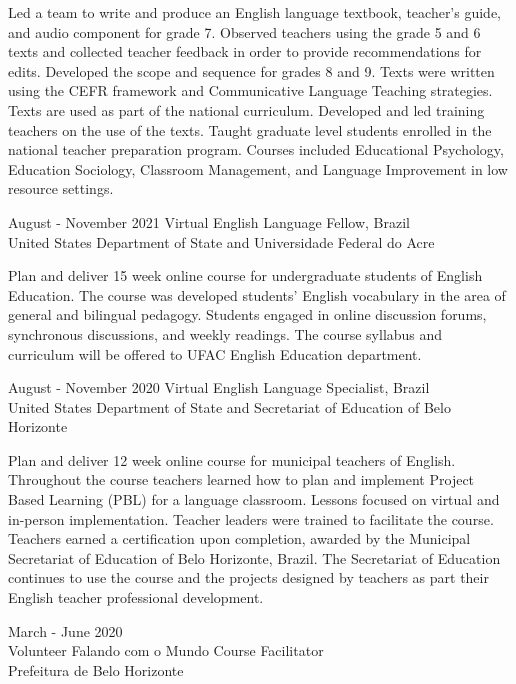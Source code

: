 \documentclass[]{scrartcl}
\begin{document}
\begin{cleanCV}
\JobDesc{}
{Led a team to write and produce an English language textbook, teacher's guide, and audio component for grade 7. Observed teachers using the grade 5 and 6 texts and collected teacher feedback in order to provide recommendations for edits. Developed the scope and sequence for grades 8 and 9. Texts were written using the CEFR framework and Communicative Language Teaching strategies. Texts are used as part of the national curriculum. Developed and led training teachers on the use of the texts. Taught graduate level students enrolled in the national teacher preparation program. Courses included Educational Psychology, Education Sociology, Classroom Management, and Language Improvement in low resource settings.}

\pagebreak    
  
\WorkExperience
{August - November 2021}
{Virtual English Language Fellow, Brazil\\}
{United States Department of State and Universidade Federal do Acre}

\JobDesc{}
{Plan and deliver 15 week online course for undergraduate students of English Education. The course was developed students' English vocabulary in the area of general and bilingual pedagogy. Students engaged in online discussion forums, synchronous discussions, and weekly readings. The course syllabus and curriculum will be offered to UFAC English Education department.}

\WorkExperience
{August - November 2020}
{Virtual English Language Specialist, Brazil\\}
{United States Department of State and Secretariat of Education of Belo Horizonte}

\JobDesc{}
{Plan and deliver 12 week online course for municipal teachers of English. Throughout the course teachers learned how to plan and implement Project Based Learning (PBL) for a language classroom. Lessons focused on virtual and in-person implementation. Teacher leaders were trained to facilitate the course. Teachers earned a certification upon completion, awarded by the Municipal Secretariat of Education of Belo Horizonte, Brazil. The Secretariat of Education continues to use the course and the projects designed by teachers as part their English teacher professional development.}

\WorkExperience
{March - June 2020 \\ Volunteer}
{Falando com o Mundo Course Facilitator}
{\\Prefeitura de Belo Horizonte}


\end{cleanCV}
\end{document}
